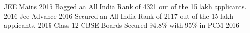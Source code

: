 \begin{cvhonors}
  \cvhonor
    {JEE Mains 2016}
    {Bagged an All India Rank of 4321 out of the 15 lakh applicants.}
    {}
    {2016}
  \cvhonor
    {Jee Advance 2016}
    {Secured an All India Rank of 2117 out of the 15 lakh applicants.}
    {}
    {2016}
  \cvhonor
    {Class 12 CBSE Boards}
    {Secured 94.8\% with 95\% in PCM}
    {}
    {2016}
\end{cvhonors}
